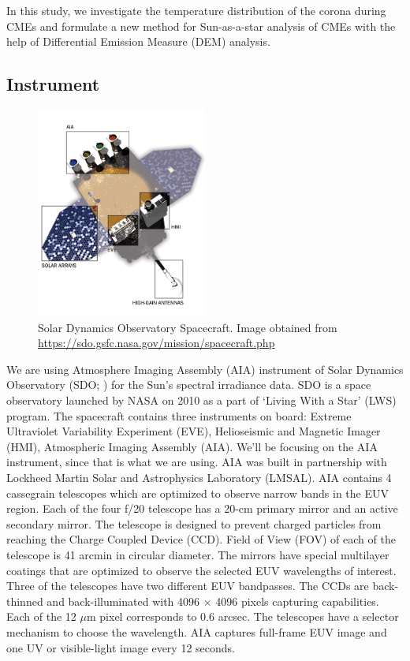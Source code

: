 In this study, we investigate the temperature distribution of the corona during CMEs and formulate a new method for Sun-as-a-star analysis of CMEs with the help of Differential Emission Measure (DEM) analysis.

\subsection{Instrument}

\begin{figure}[ht]
    \centering
    \includegraphics[width=0.5\textwidth]{images/spacecraft_detailed.jpg}
    \caption[SDO Spacecraft]{Solar Dynamics Observatory Spacecraft.
      Image obtained from {\url{https://sdo.gsfc.nasa.gov/mission/spacecraft.php}}}
    \label{fig:label}
\end{figure}

We are using Atmosphere Imaging Assembly (AIA) instrument of Solar Dynamics Observatory (SDO; \citep{Pesnell2011}) for the Sun's spectral irradiance data. SDO is a space observatory launched by NASA on 2010 as a part of `Living With a Star' (LWS) program. The spacecraft contains three instruments on board: Extreme Ultraviolet Variability Experiment (EVE), Helioseismic and Magnetic Imager (HMI), Atmospheric Imaging Assembly (AIA). We'll be focusing on the AIA instrument, since that is what we are using. AIA was built in partnership with Lockheed Martin Solar and Astrophysics Laboratory (LMSAL). AIA contains 4 cassegrain telescopes which are optimized to observe narrow bands in the EUV region. Each of the four f/20 telescope has a 20-cm primary mirror and an active secondary mirror. The telescope is designed to prevent charged particles from reaching the Charge Coupled Device (CCD). Field of View (FOV) of each of the telescope is 41 arcmin in circular diameter. The mirrors have special multilayer coatings that are optimized to observe the selected EUV wavelengths of interest. Three of the telescopes have two different EUV bandpasses. The CCDs are back-thinned and back-illuminated with 4096 $\times$ 4096 pixels capturing capabilities. Each of the 12 $\mu$m pixel corresponds to 0.6 arcsec. The telescopes have a selector mechanism to choose the wavelength. AIA captures full-frame EUV image and one UV or visible-light image every 12 seconds. \citep{Lemen2011}\\

